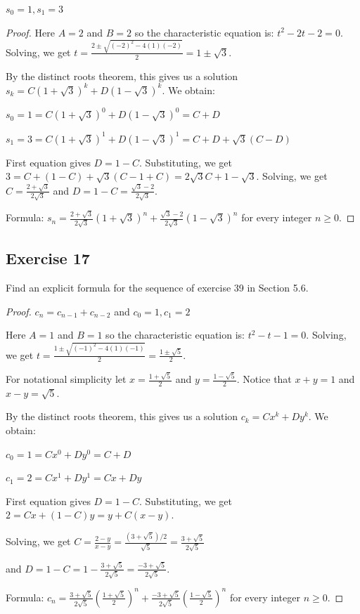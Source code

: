 \documentclass[14pt]{extarticle}
\newcommand{\dps}{\displaystyle}
\begin{document}
\(s_0 = 1, s_1 = 3\)

\begin{proof}
Here $A = 2$ and $B = 2$ so the characteristic equation is: \(t^2 - 2t - 2 = 0\). 
Solving, we get \(\dps t = \frac{2 \pm \sqrt{(-2)^2 - 4(1)(-2)}}{2} = 1 \pm \sqrt{3}\).

By the distinct roots theorem, this gives us a solution \(s_k = C(1+\sqrt{3})^k + D(1-\sqrt{3})^k\). We obtain:

\(s_0 = 1 = C(1+\sqrt{3})^0 + D(1-\sqrt{3})^0 = C + D\)

\(s_1 = 3 = C(1+\sqrt{3})^1 + D(1-\sqrt{3})^1 = C + D + \sqrt{3}(C - D)\)

First equation gives $D = 1 - C$. Substituting, we get \(3 = C + (1 - C) + \sqrt{3}(C - 1 + C) = 2\sqrt{3}C + 1 - \sqrt{3}\).
Solving, we get \(\dps C = \frac{2 + \sqrt{3}}{2\sqrt{3}}\) and \(\dps D = 1 - C = \frac{\sqrt{3} - 2}{2\sqrt{3}}\).

Formula: \(\dps s_n = \frac{2 + \sqrt{3}}{2\sqrt{3}}(1+\sqrt{3})^n + \frac{\sqrt{3} - 2}{2\sqrt{3}}(1 - \sqrt{3})^n\) 
for every integer \(n \geq 0\).
\end{proof}

\subsection{Exercise 17}
Find an explicit formula for the sequence of exercise 39 in Section 5.6.

\begin{proof}
\(c_n = c_{n-1} + c_{n-2}\) and \(c_0 = 1, c_1 = 2\)

Here $A = 1$ and $B = 1$ so the characteristic equation is: \(t^2 - t - 1 = 0\). 
Solving, we get \(\dps t = \frac{1 \pm \sqrt{(-1)^2 - 4(1)(-1)}}{2} = \frac{1 \pm \sqrt{5}}{2}\).

For notational simplicity let \(x = \frac{1 + \sqrt{5}}{2}\) and \(y = \frac{1 - \sqrt{5}}{2}\).
Notice that \(x+y = 1\) and \(x - y = \sqrt{5}\).

By the distinct roots theorem, this gives us a solution \(c_k = Cx^k + Dy^k\). We obtain:

\(c_0 = 1 = Cx^0 + Dy^0 = C + D\)

\(c_1 = 2 = Cx^1 + Dy^1 = Cx + Dy\)

First equation gives $D = 1 - C$. Substituting, we get \(2 = Cx + (1 - C)y = y + C(x-y)\).

Solving, we get \(\dps C = \frac{2-y}{x-y} = \frac{(3 + \sqrt{5}) / 2}{\sqrt{5}} = \frac{3 + \sqrt{5}}{2\sqrt{5}}\) 

and \(\dps D = 1 - C = 1 - \frac{3 + \sqrt{5}}{2\sqrt{5}} = \frac{-3 + \sqrt{5}}{2\sqrt{5}}\).

Formula: \(\dps c_n = \frac{3 + \sqrt{5}}{2\sqrt{5}}\left(\frac{1 + \sqrt{5}}{2}\right)^n + \frac{-3 + 
\sqrt{5}}{2\sqrt{5}}\left(\frac{1 - \sqrt{5}}{2}\right)^n\) 
for every integer \(n \geq 0\).
\end{proof}
\end{document}
